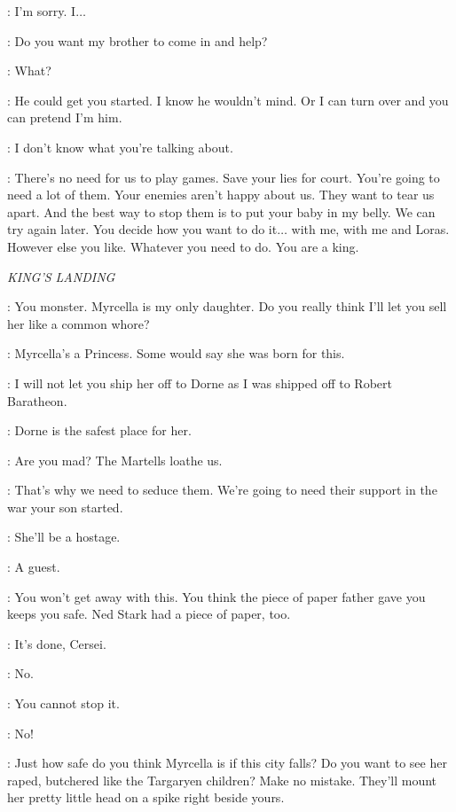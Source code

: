 
\RENLY: I'm sorry. I$\ldots$ 

\MARGAERY: Do you want my brother to come in and help? 

\RENLY: What? 

\MARGAERY: He could get you started. I know he wouldn't mind. Or I can turn over and you can pretend I'm him. 

\RENLY: I don't know what you're talking about. 

\MARGAERY: There's no need for us to play games. Save your lies for court. You're going to need a lot of them. Your enemies aren't happy about us. They want to tear us apart. And the best way to stop them is to put your baby in my belly. We can try again later. You decide how you want to do it$\ldots$ with me, with me and Loras. However else you like. Whatever you need to do. You are a king. 


\scene

\textit{KING'S LANDING} 


\CERSEI: You monster. Myrcella is my only daughter. Do you really think I'll let you sell her like a common whore? 

\TYRION: Myrcella's a Princess. Some would say she was born for this. 

\CERSEI: I will not let you ship her off to Dorne as I was shipped off to Robert Baratheon. 

\TYRION: Dorne is the safest place for her. 

\CERSEI: Are you mad? The Martells loathe us. 

\TYRION: That's why we need to seduce them. We're going to need their support in the war your son started. 

\CERSEI: She'll be a hostage. 

\TYRION: A guest. 

\CERSEI: You won't get away with this. You think the piece of paper father gave you keeps you safe. Ned Stark had a piece of paper, too. 

\TYRION: It's done, Cersei. 

\CERSEI: No. 

\TYRION: You cannot stop it. 

\CERSEI: No! 


\TYRION: Just how safe do you think Myrcella is if this city falls? Do you want to see her raped, butchered like the Targaryen children? Make no mistake. They'll mount her pretty little head on a spike right beside yours. 

